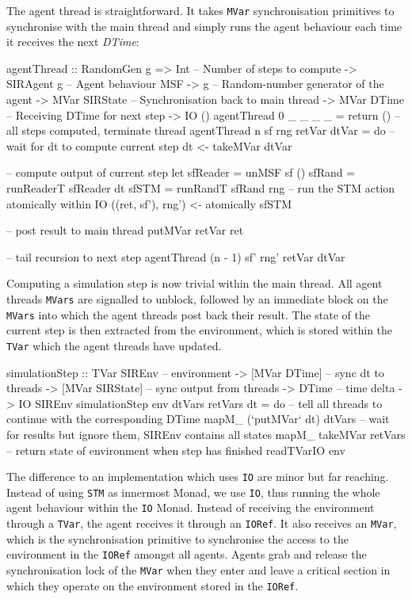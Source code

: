 The agent thread is straightforward. It takes \texttt{MVar} synchronisation primitives to synchronise with the main thread and simply runs the agent behaviour each time it receives the next \textit{DTime}:

\begin{HaskellCode}
agentThread :: RandomGen g 
            => Int             -- Number of steps to compute
            -> SIRAgent g      -- Agent behaviour MSF
            -> g               -- Random-number generator of the agent
            -> MVar SIRState   -- Synchronisation back to main thread
            -> MVar DTime      -- Receiving DTime for next step
            -> IO ()
agentThread 0 _ _ _ _ = return () -- all steps computed, terminate thread
agentThread n sf rng retVar dtVar = do
  -- wait for dt to compute current step
  dt <- takeMVar dtVar

  -- compute output of current step
  let sfReader = unMSF sf ()
      sfRand   = runReaderT sfReader dt
      sfSTM    = runRandT sfRand rng
  -- run the STM action atomically within IO
  ((ret, sf'), rng') <- atomically sfSTM 

  -- post result to main thread
  putMVar retVar ret
  
  -- tail recursion to next step 
  agentThread (n - 1) sf' rng' retVar dtVar
\end{HaskellCode}

Computing a simulation step is now trivial within the main thread. All agent threads \texttt{MVars} are signalled to unblock, followed by an immediate block on the \texttt{MVars} into which the agent threads post back their result. The state of the current step is then extracted from the environment, which is stored within the \texttt{TVar} which the agent threads have updated.

\begin{HaskellCode}
simulationStep :: TVar SIREnv     -- environment 
               -> [MVar DTime]    -- sync dt to threads
               -> [MVar SIRState] -- sync output from threads
               -> DTime           -- time delta
               -> IO SIREnv
simulationStep env dtVars retVars dt = do
  -- tell all threads to continue with the corresponding DTime
  mapM_ (`putMVar` dt) dtVars
  -- wait for results but ignore them, SIREnv contains all states
  mapM_ takeMVar retVars
  -- return state of environment when step has finished
  readTVarIO env
\end{HaskellCode}

The difference to an implementation which uses \texttt{IO} are minor but far reaching. Instead of using \texttt{STM} as innermost Monad, we use \texttt{IO}, thus running the whole agent behaviour within the \texttt{IO} Monad. Instead of receiving the environment through a \texttt{TVar}, the agent receives it through an \texttt{IORef}. It also receives an \texttt{MVar}, which is the synchronisation primitive to synchronise the access to the environment in the \texttt{IORef} amongst all agents. Agents grab and release the synchronisation lock of the \texttt{MVar} when they enter and leave a critical section in which they operate on the environment stored in the \texttt{IORef}.
